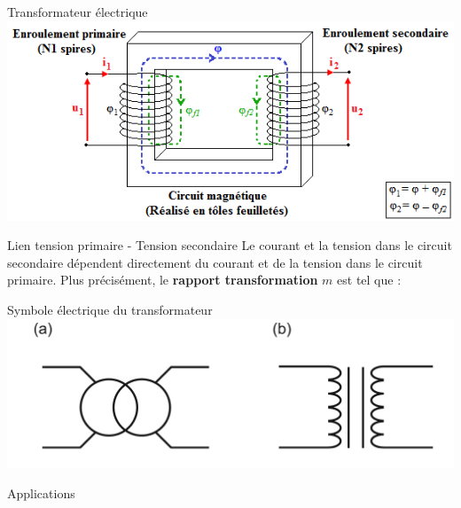 \documentclass{beamer}
\begin{document}
\begin{frame}{Transformateur électrique}
  \centering
  \includegraphics[height=.4\textheight]{images/transfo_principe}
  \begin{alertblock}{Lien tension primaire - Tension secondaire}
    Le courant et la tension dans le circuit secondaire dépendent directement du courant et de la tension dans le circuit primaire. Plus précisément, le \textbf{rapport transformation} $m$ est tel que :
    \begin{center}
    \end{center}
  \end{alertblock}
\end{frame}

\begin{frame}{Symbole électrique du transformateur}
  \centering
  \includegraphics[height=.4\textheight]{images/Symb-transfo}
\end{frame}



    \begin{frame}[focus]
        Applications
    \end{frame}

    \appendix
\end{document}

